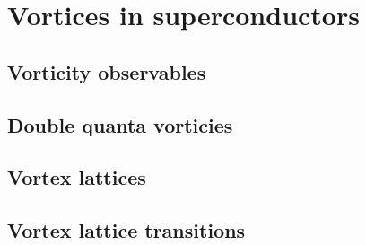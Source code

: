 \chapter{Vortices in superconductors}


\section{Vorticity observables}


\section{Double quanta vorticies}

\section{Vortex lattices}


\section{Vortex lattice transitions}
